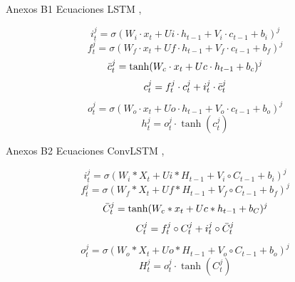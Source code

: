 \documentclass[aspectratio=169]{beamer}
\begin{document}
\begin{frame}{Anexos B1}
Ecuaciones LSTM \cite{LSTM},
    \begin{enumerate}
    \begin{equation}
        i_{t}^{j}= \sigma (W_{i}\cdot{x_{t}} + U{i}\cdot{h_{t-1}} + V_{i}\cdot{c_{t-1}}  + b_{i})^{j}
    \end{equation}
    \begin{equation}
        f_{t}^{j}= \sigma (W_{f}\cdot{x_{t}} + U{f}\cdot{h_{t-1}} + V_{f}\cdot{c_{t-1}}  + b_{f})^{j}
    \end{equation}
    \begin{equation}
        \Bar{c}_{t}^{j}= \tanh (W_{c}\cdot{x_{t}} + U{c}\cdot{h_{t-1}} + b_{c})^{j} 
    \end{equation}
    \begin{equation}
         {c}_{t}^{j}= f_{t}^{j}\cdot{c_{t}^{j}} + i_{t}^{j}\cdot{\Bar{c}_{t}^{j}}
    \end{equation} 
    \begin{equation}
          o_{t}^{j}= \sigma (W_{o}\cdot{x_{t}} + U{o}\cdot{h_{t-1}} + V_{o}\cdot{c_{t-1}}  + b_{o})^{j}
    \end{equation}
    \begin{equation}
        {h}_{t}^{j}= o_{t}^{j} \cdot \tanh({c}_{t}^{j})
    \end{equation}
    
\end{enumerate}

    
\end{frame}

\begin{frame}{Anexos B2}
Ecuaciones ConvLSTM \cite{convlstm},
\begin{enumerate}
    \begin{equation}
        i_{t}^{j}= \sigma (W_{i}*{X_{t}} + U{i}*{H_{t-1}} + V_{i}\circ{C_{t-1}}  + b_{i})^{j}
    \end{equation}
    \begin{equation}
        f_{t}^{j}= \sigma (W_{f}*{X_{t}} + U{f}*{H_{t-1}} + V_{f}\circ{C_{t-1}}  + b_{f})^{j}
    \end{equation}
    \begin{equation}
        \Bar{C}_{t}^{j}= \tanh (W_{c}*{x_{t}} + U{c}*{h_{t-1}} + b_{C})^{j} 
    \end{equation}
    \begin{equation}
         {C}_{t}^{j}= f_{t}^{j}\circ{C_{t}^{j}} + i_{t}^{j}\circ{\Bar{C}_{t}^{j}}
    \end{equation} 
    \begin{equation}
          o_{t}^{j}= \sigma (W_{o}*{X_{t}} + U{o}*{H_{t-1}} + V_{o}\circ{C_{t-1}}  + b_{o})^{j}
    \end{equation}
    \begin{equation}
        {H}_{t}^{j}= o_{t}^{j} \cdot \tanh ({C}_{t}^{j})
    \end{equation}
    
\end{enumerate}
\end{frame}
\end{document}
